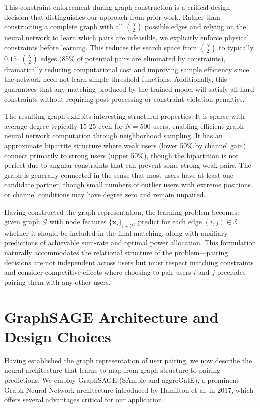 This constraint enforcement during graph construction is a critical design decision that distinguishes our approach from prior work. Rather than constructing a complete graph with all $\binom{N}{2}$ possible edges and relying on the neural network to learn which pairs are infeasible, we explicitly enforce physical constraints before learning. This reduces the search space from $\binom{N}{2}$ to typically $0.15 \cdot \binom{N}{2}$ edges (85\% of potential pairs are eliminated by constraints), dramatically reducing computational cost and improving sample efficiency since the network need not learn simple threshold functions. Additionally, this guarantees that any matching produced by the trained model will satisfy all hard constraints without requiring post-processing or constraint violation penalties.

The resulting graph exhibits interesting structural properties. It is sparse with average degree typically 15-25 even for $N=500$ users, enabling efficient graph neural network computation through neighborhood sampling. It has an approximate bipartite structure where weak users (lower 50\% by channel gain) connect primarily to strong users (upper 50\%), though the bipartition is not perfect due to angular constraints that can prevent some strong-weak pairs. The graph is generally connected in the sense that most users have at least one candidate partner, though small numbers of outlier users with extreme positions or channel conditions may have degree zero and remain unpaired.

Having constructed the graph representation, the learning problem becomes: given graph $\mathcal{G}$ with node features $\{\mathbf{x}_i\}_{i \in \mathcal{V}}$, predict for each edge $(i,j) \in \mathcal{E}$ whether it should be included in the final matching, along with auxiliary predictions of achievable sum-rate and optimal power allocation. This formulation naturally accommodates the relational structure of the problem—pairing decisions are not independent across users but must respect matching constraints and consider competitive effects where choosing to pair users $i$ and $j$ precludes pairing them with any other users.

\section{GraphSAGE Architecture and Design Choices}

Having established the graph representation of user pairing, we now describe the neural architecture that learns to map from graph structure to pairing predictions. We employ GraphSAGE (SAmple and aggreGatE), a prominent Graph Neural Network architecture introduced by Hamilton et al. in 2017, which offers several advantages critical for our application.

